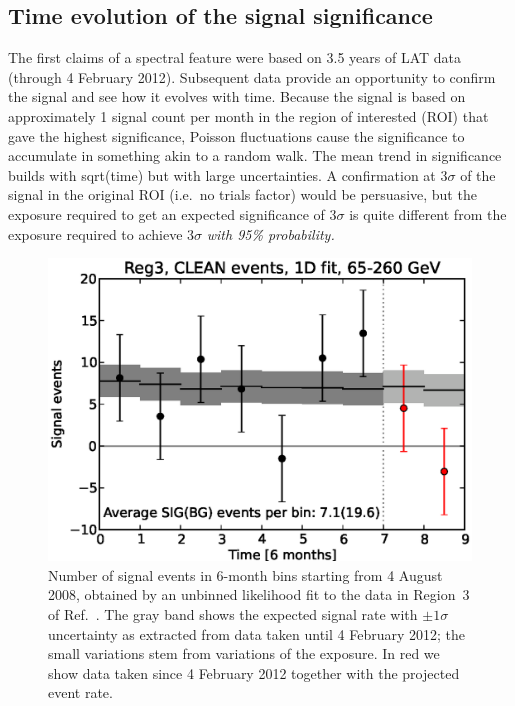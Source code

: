 \documentclass[aps,prd,superscriptaddress,nofootinbib,fixlfloat, 12pt]{revtex4-1}
\begin{document}
\subsection{Time evolution of the signal significance}
The first claims of a spectral feature \citep{Bringmann:2012,Weniger:2012}
were based on 3.5 years of LAT data (through 4 February 2012).  Subsequent
data provide an opportunity to confirm the signal and see how it evolves with
time.  Because the signal is based on approximately 1 signal count per month
in the region of interested (ROI) that gave the highest significance, Poisson fluctuations cause the significance to accumulate in
something akin to a random walk.  The mean trend in significance builds with
sqrt(time) but with large uncertainties.  A confirmation at $3\sigma$ of the
signal in the original ROI (i.e.~no trials factor) would be persuasive, but
the exposure required to get an expected significance of $3\sigma$ is quite
different from the exposure required to achieve $3\sigma$ \emph{with 95\%
  probability.}

\begin{figure}[h]
  \begin{center}
    \includegraphics[width=0.60\linewidth]{plots/semester_fluxes.eps}
    \vspace{-0.5cm}
  \end{center}
  \caption{Number of signal events in 6-month bins starting from 4
    August 2008, obtained by an unbinned likelihood fit to the data in
    Region~3 of Ref.~\cite{Weniger:2012}. The gray band shows the expected
    signal rate with $\pm1\sigma$ uncertainty as extracted from data taken until
    4 February 2012; the small variations stem from variations of the
    exposure. In red we show data taken since 4 February 2012
    together with the projected event rate.}
  \label{fig:semester_fluxes}
\end{figure}
\end{document}
